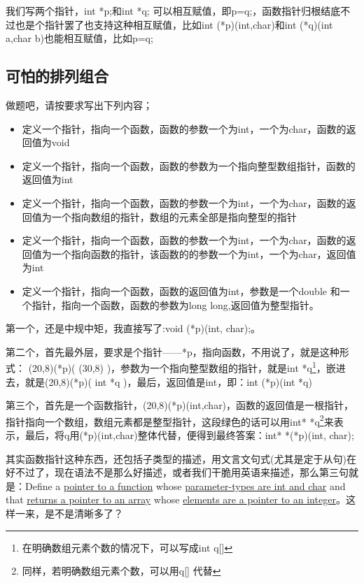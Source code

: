 \documentclass[11pt,twoside,a4paper,titlepage]{article}	%
\begin{document}
我们写两个指针，int *p;和int *q; 可以相互赋值，即p=q;，函数指针归根结底不过也是个指针罢了也支持这种相互赋值，比如int (*p)(int,char)和int (*q)(int a,char b)也能相互赋值，比如p=q;

\subsection{可怕的排列组合}
做题吧，请按要求写出下列内容；

\begin{itemize}
	\item 定义一个指针，指向一个函数，函数的参数一个为int，一个为char，函数的返回值为void
	\item 定义一个指针，指向一个函数，函数的参数为一个指向整型数组指针，函数的返回值为int
	\item 定义一个指针，指向一个函数，函数的参数一个为int，一个为char，函数的返回值为一个指向数组的指针，数组的元素全部是指向整型的指针
	\item 定义一个指针，指向一个函数，函数的参数一个为int，一个为char，函数的返回值为一个指向函数的指针，该函数的的参数一个为int，一个为char，返回值为int
	\item 定义一个指针，指向一个函数，函数的返回值为int，参数是一个double 和一个指针，指向一个函数，函数的参数为long long,返回值为整型指针。
\end{itemize}

第一个，还是中规中矩，我直接写了:void (*p)(int, char);。

第二个，首先最外层，要求是个指针——*p，指向函数，不用说了，就是这种形式： \framebox(20,8){}(*p)( \framebox(30,8){} )，参数为一个指向整型数组的指针，就是int *q\footnote{在明确数组元素个数的情况下，可以写成int q[]}，嵌进去，就是\framebox(20,8){}(*p)( int *q )，最后，返回值是int，即：int (*p)(int *q)

第三个，首先是一个函数指针，\framebox(20,8){}(*p)(int,char)，函数的返回值是\textcolor[rgb]{.0,.5,.0}{一根指针，指针指向一个数组，数组元素都是整型指针}，这段绿色的话可以用int* *q\footnote{同样，若明确数组元素个数，可以用q[] 代替}来表示，最后，将q用(*p)(int,char)整体代替，便得到最终答案：int* *(*p)(int, char);

其实函数指针这种东西，还包括子类型的描述，用文言文句式(尤其是定于从句)在好不过了，现在语法不是那么好描述，或者我们干脆用英语来描述，那么第三句就是：Define a \uline{pointer to a function} whose \uline{parameter-types are int and char} and that \uline{returns a pointer to an array} whose \uline{elements are a pointer to an integer}。这样一来，是不是清晰多了？
\end{document}
